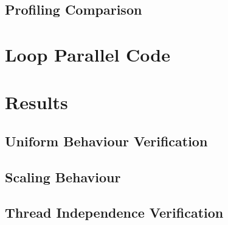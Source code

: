 \documentclass[draft]{article}
\begin{document}
\subsection{Profiling Comparison}
\label{sec:profiling-comparison}

\section{Loop Parallel Code}
\label{sec:loop-parallel-code}

\section{Results}
\label{sec:results}

\subsection{Uniform Behaviour Verification}
\label{sec:unif-behav-verif}

\subsection{Scaling Behaviour}
\label{sec:scaling-behaviour}

\subsection{Thread Independence Verification}
\label{sec:thre-indep-verif}
\end{document}
